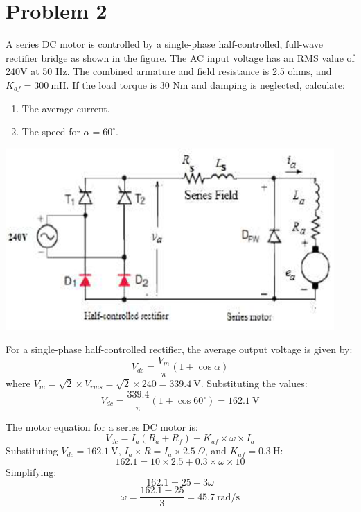 \documentclass[12pt]{article}
\begin{document}
	
	\section*{Problem 2}
	A series DC motor is controlled by a single-phase half-controlled, full-wave rectifier bridge as shown in the figure. The AC input voltage has an RMS value of 240V at 50 Hz. The combined armature and field resistance is 2.5 ohms, and $K_{af} = 300\ \text{mH}$. If the load torque is 30 Nm and damping is neglected, calculate:
	\begin{enumerate}
		\item The average current.
		\item The speed for $\alpha = 60^\circ$.
	\end{enumerate}
	\begin{center}
		\includegraphics[scale=1.3]{pic1.png}
	\end{center}
	
	\maketitle
	\noindent For a single-phase half-controlled rectifier, the average output voltage is given by:
	\[V_{dc} = \frac{V_m}{\pi} (1 + \cos \alpha)\]
	where \(V_m = \sqrt{2} \times V_{rms} = \sqrt{2} \times 240 = 339.4\ \text{V}\). Substituting the values:
	\[V_{dc} = \frac{339.4}{\pi} (1 + \cos 60^\circ) = 162.1\ \text{V}\]
	
	\noindent The motor equation for a series DC motor is:
	\[V_{dc} = I_a (R_a + R_f) + K_{af} \times \omega \times I_a\]
	Substituting \(V_{dc} = 162.1\ \text{V}\), \(I_a \times R = I_a \times 2.5\ \Omega\), and \(K_{af} = 0.3\ \text{H}\):
	\[162.1 = 10 \times 2.5 + 0.3 \times \omega \times 10\]
	Simplifying:
	\[162.1 = 25 + 3\omega\]
	\[\omega = \frac{162.1 - 25}{3} = 45.7\ \text{rad/s}\]
	
\end{document}

